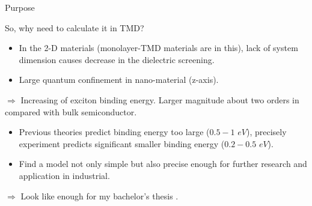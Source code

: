 \documentclass{beamer}
\begin{document}
\begin{frame}{Purpose}
\begin{center}
	So, why need to calculate it in TMD?
\end{center}
\begin{itemize}
\item In the 2-D materials (monolayer-TMD materials are in this), lack of system dimension causes decrease in the dielectric screening.
\item Large quantum confinement in nano-material (z-axis).
\end{itemize}
$\Rightarrow$ Increasing of exciton binding energy. Larger magnitude about two orders in compared with bulk semiconductor.\\
\begin{itemize}
\item Previous theories predict binding energy too large ($0.5-1$ \(eV\)), precisely experiment predicts significant smaller binding energy ($0.2-0.5$ \(eV\)).
\item Find a model not only simple but also precise enough for further research and application in industrial.
\end{itemize}
$\Rightarrow$ Look like enough for my bachelor's thesis \smiley{}.
\end{frame}
\end{document}
